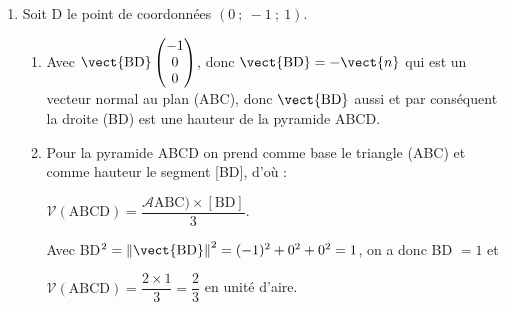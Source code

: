 \begin{enumerate}
\begin{enumerate}
O a donc $\mathcal{A}(\text{ABC}) = \dfrac{\text{BC} \times \text{AH}}{2}$.

Comme BC$^2 = (1 - 1)^2 + (- 1 + 1)^2 + (- 1 - 1)^2 = 0 + 0 + 4$, d'où BC $ = 2$.

Donc $\mathcal{A}(\text{ABC}) = \dfrac{2 \times 2}{2} = 2$.
		

	\end{enumerate}
\item Soit D le point de coordonnées $(0~;~-1~;~1)$.
	\begin{enumerate}
		\item 
		Avec $\vect{\text{BD}}\begin{pmatrix}- 1\\0\\0\end{pmatrix}$, donc $\vect{\text{BD}} = - \vect{n}$ qui est un vecteur normal au plan (ABC), donc $\vect{\text{BD}}$ aussi et par conséquent la droite (BD) est une hauteur de la pyramide ABCD.
		\item 
		Pour la pyramide ABCD on prend comme base le triangle (ABC) et comme hauteur le segment [BD], d'où :
		
		$\mathcal{V}(\text{ABCD}) = \dfrac{\mathcal{A}\text{ABC}) \times [\text{BD}]}{3}$.
		
		Avec BD$^2 = \left\|\vect{\text{BD}}\right\|^2 = (- 1)^2 + 0^2 + 0^2 = 1$, on a donc BD $ = 1$ et 
		
		$\mathcal{V}(\text{ABCD}) = \dfrac{2\times 1}{3} = \dfrac23$ en unité d'aire.
	\end{enumerate}
	




\end{enumerate}

\bigskip
